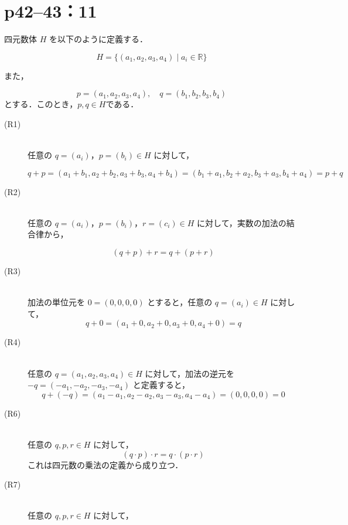 \section*{p42--43：11}
\begin{tproof}
    四元数体 $H$ を以下のように定義する．

    \[
        H = \{ (a_1, a_2, a_3, a_4) \mid a_i \in \mathbb{R}\}
    \]

    また，

    \[
        p=(a_1, a_2, a_3, a_4),\quad q=(b_1, b_2, b_3, b_4)
    \]
    とする．このとき，$ p ,q \in H$である．
    \begin{description}
        \item [(R1)] \mbox{} \\
              任意の $q = (a_i)$，$p = (b_i) \in H$ に対して，

              \[
                  q + p = (a_1 + b_1, a_2 + b_2, a_3 + b_3, a_4 + b_4) = (b_1 + a_1, b_2 + a_2, b_3 + a_3, b_4 + a_4) = p + q
              \]
        \item [(R2)] \mbox{} \\
              任意の $q = (a_i)$，$p = (b_i)$，$r = (c_i) \in H$ に対して，実数の加法の結合律から，

              \[
                  (q + p) + r = q + (p + r)
              \]
        \item [(R3)] \mbox{} \\
              加法の単位元を $0 = (0, 0, 0, 0)$ とすると，任意の $q = (a_i) \in H$ に対して，
              \[
                  q + 0 = (a_1 + 0, a_2 + 0, a_3 + 0, a_4 + 0) = q
              \]

        \item [(R4)] \mbox{} \\
              任意の $q = (a_1, a_2, a_3, a_4) \in H$ に対して，加法の逆元を $-q = (-a_1, -a_2, -a_3, -a_4)$ と定義すると，
              \[
                  q + (-q) = (a_1 - a_1, a_2 - a_2, a_3 - a_3, a_4 - a_4) = (0, 0, 0, 0) = 0
              \]
        \item [(R6)] \mbox{} \\
              任意の $q, p, r \in H$ に対して，
              \[
                  (q \cdot p) \cdot r = q \cdot (p \cdot r)
              \]
              これは四元数の乗法の定義から成り立つ．
        \item[(R7)] \mbox{} \\
              任意の $q, p, r \in H$ に対して，


\end{description}
\end{tproof}
